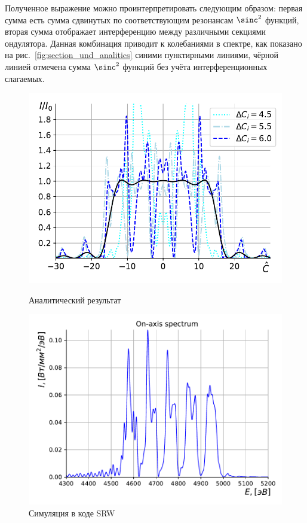 Полученное выражение можно проинтерпретировать следующим образом: первая сумма есть сумма сдвинутых по соответствующим резонансам $\sinc^2$ функций, вторая сумма отображает интерференцию между различными секциями ондулятора. Данная комбинация приводит к колебаниями в спектре, как показано на рис.~\ref{fig:section_und_analitics} синими пунктирными линиями, чёрной линией отмечена сумма $\sinc^2$ функций без учёта интерференционных слагаемых.
\begin{figure}[h!]
	\centering  
	\begin{minipage}{0.49\textwidth}
		\centering
		\includegraphics[width=\textwidth]{pic/spec_from_sec_und.pdf}
		\caption{Аналитический результат}
		\label{fig:section_und_analitics}
	\end{minipage}\hfill
	\begin{minipage}{0.49\textwidth}
		\centering
		\includegraphics[width=\textwidth]{pic/sim_und_spec.pdf}
		\caption{Симуляция в коде SRW}
		\label{fig:section_und_SRW}
	\end{minipage}    
\end{figure}
